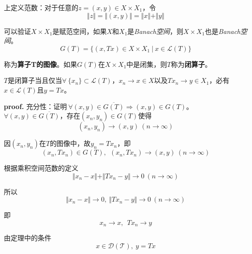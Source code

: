 上定义范数：对于任意的$z=(x,y)\in X\times X_1$，令
\begin{equation}
    \Vert z\Vert=\Vert (x,y)\Vert =\Vert x\Vert+\Vert y\Vert
\end{equation}

可以验证$X\times X_1$是赋范空间，如果$X$和$X_1$是\textsl{Banach空间}，则$X\times X_1$也是\textsl{Banach空间}。
\begin{equation}
    G(T)=\{(x,Tx)\in X\times X_1\ |\ x\in \mathcal{L}(T) \}
\end{equation}

称为\textbf{算子T的图像}。如果$G(T)$在$X\times X_1$中是闭集，则$T$称为\textbf{闭算子}。
\begin{mdframed}
    \begin{theorem}
        $T$是闭算子当且仅当$\forall\ \{x_n\}\subset \mathcal{L}(T)$，$x_n\rightarrow x\in X$以及$Tx_n\rightarrow y\in X_1$，必有$x\in \mathcal{L}(T)$且$y=Tx$。        
    \end{theorem}
\end{mdframed}
\textbf{proof.}\hspace*{0.5em} 充分性：证明$\ \forall(x,y)\in \overline{G(T)}\Rightarrow (x,y)\in G(T)$。$\forall (x,y)\in \overline{G(T)}$，存在$(x_n,y_n)\in G(T)$使得
\begin{equation}
    (x_n,y_n)\rightarrow (x,y)\ (n\rightarrow \infty)
\end{equation}

因$(x_n,y_n)$在$T$的图像中，故$y_n=Tx_n$，即
\begin{equation}
    (x_n,Tx_n)\in G(T),\ \ (x_n,Tx_n)\rightarrow (x,y)\ (n\rightarrow \infty)
\end{equation}

根据乘积空间范数的定义
\begin{equation}
    \Vert x_n-x\Vert + \Vert Tx_n-y\Vert\rightarrow 0\ (n\rightarrow \infty)
\end{equation}

所以
\begin{equation}
    \Vert x_n-x\Vert\rightarrow 0,\ \Vert Tx_n-y\Vert\rightarrow 0\ (n\rightarrow \infty)
\end{equation}

即
\begin{equation}
    x_n\rightarrow x,\ \ Tx_n\rightarrow y
\end{equation}

由定理中的条件
\begin{equation}
    x\in \mathcal{D(T)},\ y=Tx
\end{equation}

